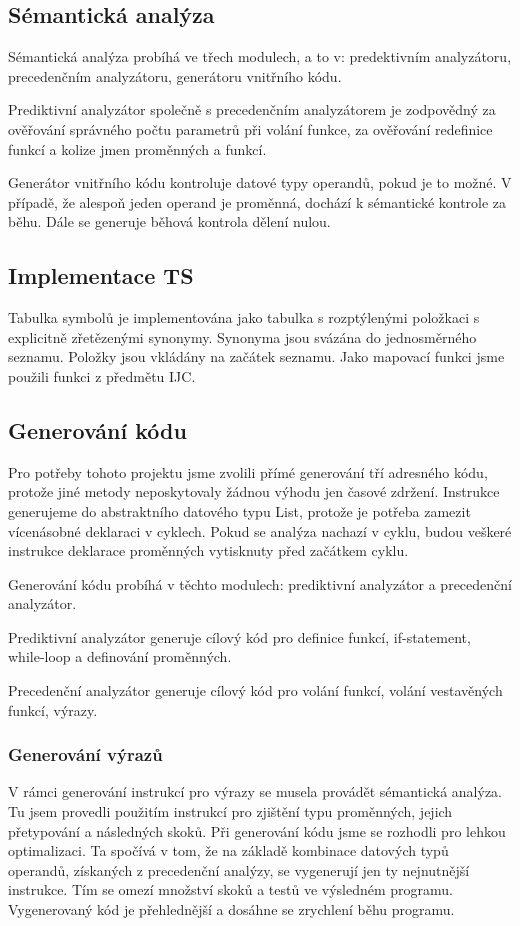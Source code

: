 \documentclass[11pt, a4paper]{article}
\begin{document}
\subsection{Sémantická analýza}
Sémantická analýza probíhá ve třech modulech, a to v: predektivním analyzátoru, precedenčním analyzátoru, generátoru vnitřního kódu. 

Prediktivní analyzátor společně s precedenčním analyzátorem je zodpovědný za ověřování správného počtu parametrů při volání funkce, za ověřování redefinice funkcí a kolize jmen proměnných a funkcí. 

Generátor vnitřního kódu kontroluje datové typy operandů, pokud je to možné. V případě, že alespoň jeden operand je proměnná, dochází k sémantické kontrole za běhu. Dále se generuje běhová kontrola dělení nulou. 

\subsection{Implementace TS}
Tabulka symbolů je implementována jako tabulka s rozptýlenými položkaci s explicitně zřetězenými synonymy. Synonyma jsou svázána do jednosměrného seznamu. Položky jsou vkládány na začátek seznamu. Jako mapovací funkci jsme použili funkci z předmětu IJC.

\subsection{Generování kódu}
Pro potřeby tohoto projektu jsme zvolili přímé generování tří adresného kódu, protože jiné metody neposkytovaly žádnou výhodu jen časové zdržení. Instrukce generujeme do abstraktního datového typu List, protože je potřeba zamezit vícenásobné deklaraci v cyklech. Pokud se analýza nachazí v cyklu, budou veškeré instrukce deklarace proměnných vytisknuty před začátkem cyklu.

Generování kódu probíhá v těchto modulech: prediktivní analyzátor a precedenční analyzátor. 

Prediktivní analyzátor generuje cílový kód pro definice funkcí, if-statement, while-loop a definování proměnných.

Precedenční analyzátor generuje cílový kód pro volání funkcí, volání vestavěných funkcí, výrazy.  

\subsubsection{Generování výrazů}
V rámci generování instrukcí pro výrazy se musela provádět sémantická analýza. Tu jsem provedli použitím instrukcí pro zjištění typu proměnných, jejich přetypování a následných skoků. Při generování kódu jsme se rozhodli pro lehkou optimalizaci. Ta spočívá v tom, že na základě kombinace datových typů operandů, získaných z precedenční analýzy, se vygenerují jen ty nejnutnější instrukce. Tím se omezí množství skoků a testů ve výsledném programu. Vygenerovaný kód je přehlednější a dosáhne se zrychlení běhu programu. 
\end{document}
